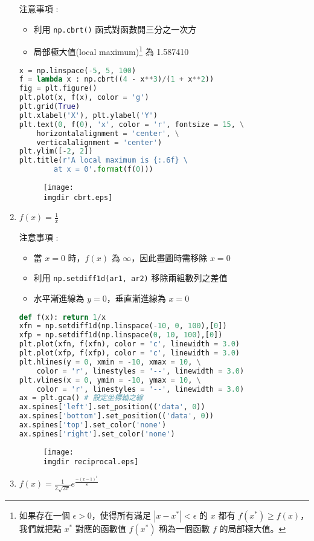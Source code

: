 \begin{enumerate}
注意事項 : 
\begin{itemize}
\item
利用 \verb|np.cbrt()| 函式對函數開三分之一次方
\item
局部極大值(local maximum)\footnote{如果存在一個 $\epsilon > 0$，使得所有滿足 $|x - x^*| < \epsilon$ 的 $x$ 都有 $f(x^*)\geq f(x)$，我們就把點 $x^*$ 對應的函數值 $f(x^*)$ 稱為一個函數 $f$ 的局部極大值。} 為 1.587410 
\end{itemize}
\bigskip
\begin{lstlisting}[language = Python]
x = np.linspace(-5, 5, 100)
f = lambda x : np.cbrt((4 - x**3)/(1 + x**2))
fig = plt.figure()
plt.plot(x, f(x), color = 'g')
plt.grid(True)
plt.xlabel('X'), plt.ylabel('Y')
plt.text(0, f(0), 'x', color = 'r', fontsize = 15, \
    horizontalalignment = 'center', \
    verticalalignment = 'center')
plt.ylim([-2, 2])
plt.title(r'A local maximum is {:.6f} \
		at x = 0'.format(f(0)))
\end{lstlisting}
\begin{figure}[H]
    \centering
        \texttt{[image: \\imgdir cbrt.eps]}
\end{figure}
\item
$\displaystyle f(x) = \frac{1}{x}$
\vspace{0.2cm}

注意事項 : 
\begin{itemize}
\item
當 $x = 0$ 時，$f(x)$ 為 $\infty$，因此畫圖時需移除 $x = 0$
\item
利用 \verb|np.setdiff1d(ar1, ar2)| 移除兩組數列之差值
\item
水平漸進線為 $y = 0$，垂直漸進線為 $x = 0$
\end{itemize}
\bigskip
\begin{lstlisting}[language = Python]
def f(x): return 1/x
xfn = np.setdiff1d(np.linspace(-10, 0, 100),[0])  
xfp = np.setdiff1d(np.linspace(0, 10, 100),[0])   
plt.plot(xfn, f(xfn), color = 'c', linewidth = 3.0)
plt.plot(xfp, f(xfp), color = 'c', linewidth = 3.0)
plt.hlines(y = 0, xmin = -10, xmax = 10, \
	color = 'r', linestyles = '--', linewidth = 3.0)
plt.vlines(x = 0, ymin = -10, ymax = 10, \
	color = 'r', linestyles = '--', linewidth = 3.0)
ax = plt.gca() # 設定坐標軸之線
ax.spines['left'].set_position(('data', 0)) 
ax.spines['bottom'].set_position(('data', 0)) 
ax.spines['top'].set_color('none') 
ax.spines['right'].set_color('none') 
\end{lstlisting}
\begin{figure}[H]
    \centering
        \texttt{[image: \\imgdir reciprocal.eps]}
\end{figure}
\item
$\displaystyle f(x) = \frac{1}{2\sqrt{2\pi}}e^{\frac{-(x-1)^2}{8}}$
\vspace{0.2cm}


\end{enumerate}
